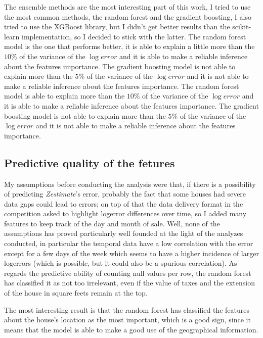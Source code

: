 The ensemble methods are the most interesting part of this work, I tried to use the most common methods, the random forest and the gradient boosting, I also tried to use the XGBoost library, but I didn't get better results than the scikit-learn implementation, so I decided to stick with the latter. The random forest model is the one that performs better, it is able to explain a little more than the $10\%$ of the variance of the $\log error$ and it is able to make a reliable inference about the features importance. The gradient boosting model is not able to explain more than the $5\%$ of the variance of the $\log error$ and it is not able to make a reliable inference about the features importance. The random forest model is able to explain more than the $10\%$ of the variance of the $\log error$ and it is able to make a reliable inference about the features importance. The gradient boosting model is not able to explain more than the $5\%$ of the variance of the $\log error$ and it is not able to make a reliable inference about the features importance.



\subsection{Predictive quality of the fetures}\label{crafted_features}

My assumptions before conducting the analysis were that, if there is a possibility of predicting \textit{Zestimate}'s error, probably the fact that some houses had severe data gaps could lead to errors; on top of that the data delivery format in the competition asked to highlight logerror differences over time, so I added many features to keep track of the day and month of sale. Well, none of the assumptions has proved particularly well founded at the light of the analyzes conducted, in particular the temporal data have a low correlation with the error except for a few days of the week which seems to have a higher incidence of larger logerrors (which is possible, but it could also be a spurious correlation). As regards the predictive ability of counting null values per row, the random forest has classified it as not too irrelevant, even if the value of taxes and the extension of the house in square feets remain at the top.


The most interesting result is that the random forest has classified the features about the house's location as the most important, which is a good sign, since it means that the model is able to make a good use of the geographical information.